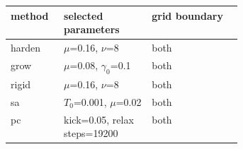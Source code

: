 \begin{tabular}{lp{0.38\linewidth}l}\toprule
method & selected parameters & grid boundary\\\midrule
harden & $\mu$=0.16, $\nu$=8 & both\\
grow & $\mu$=0.08, $\gamma_0$=0.1 & both\\
rigid & $\mu$=0.16, $\nu$=8 & both\\
sa & $T_0$=0.001, $\mu$=0.02 & both\\
pc & kick=0.05, relax steps=19200 & both\\
\bottomrule\end{tabular}
